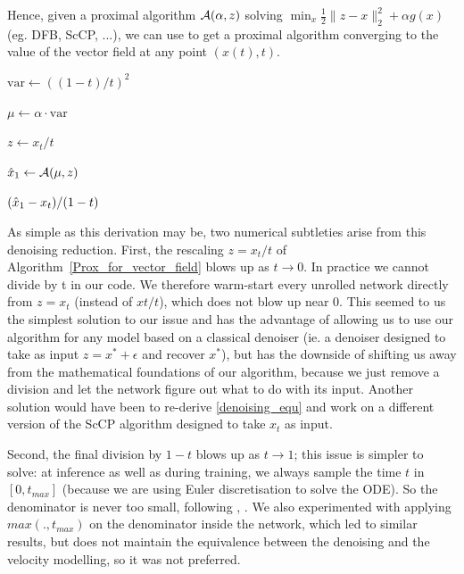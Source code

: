 \documentclass[a4paper,11pt]{article}
\theoremstyle{plain}{\theorembodyfont{\rmfamily}%
\newtheorem{proposition}[theorem]{Proposition}}
\theoremstyle{plain}{\theorembodyfont{\rmfamily}%
\newtheorem{notation}[theorem]{Notation}}
\theoremstyle{plain}{\theorembodyfont{\rmfamily}%
\newtheorem{assumption}[theorem]{Assumption}}
\theoremstyle{plain}{\theorembodyfont{\rmfamily}%
\newtheorem{problem}[theorem]{Problem}}
\theoremstyle{plain}{\theorembodyfont{\rmfamily}%
\newtheorem{example}[theorem]{Example}}
\theoremstyle{plain}{\theorembodyfont{\rmfamily}%
\newtheorem{remark}[theorem]{Remark}}
\theoremstyle{plain}{\theorembodyfont{\rmfamily}%
\newtheorem{definition}[theorem]{Definition}}
\theoremstyle{plain}{\theorembodyfont{\rmfamily}%
\newtheorem{question}[theorem]{Question}}
\numberwithin{equation}{section}
\begin{document}
Hence, given a proximal algorithm ${\mathcal{A}}(\alpha,z)$ solving $\min_{x} \frac{1}{2} \| z - x \|_2^2 + \alpha g(x)$ (eg. DFB, ScCP, ...), we can use  to get a proximal algorithm converging to the value of the vector field at any point $(x(t),t)$.

\begin{algorithm}
\caption{Prox\_for\_vector\_field($\Ac, x_t, t, \alpha$)}\label{Prox_for_vector_field}
\begin{algorithmic}[1]
\State $\mathrm{var} \gets ((1-t)/t)^2$ 

\State $\mu \gets \alpha \cdot \mathrm{var}$

\State $z \gets x_t/t$

\State $\Hat{x}_1 \gets {\ensuremath{\mathcal{A}}}(\mu,z)$

\Return $(\Hat{x}_1 - x_t)/(1-t)$

\end{algorithmic}
\end{algorithm}

As simple as this derivation may be, two numerical subtleties arise from this denoising reduction. First, the rescaling $z = x_t/t$ of Algorithm~\ref{Prox_for_vector_field} blows up as
$t \to 0$. In practice we cannot divide by t in our code. We therefore warm-start every unrolled network directly
from $z = x_t$ (instead of $xt/t$), which does not blow up near $0$. This seemed to us the simplest solution to our issue and has the advantage of allowing us to use our algorithm for any model based on a classical denoiser (ie. a denoiser designed to take as input $z = x^* + \epsilon$ and recover $x^*$), but has the downside of shifting us away from the mathematical foundations of our algorithm, because we just remove a division and let the network figure out what to do with its input. Another solution would have been to re-derive \ref{denoising_equ} and work on a different version of the ScCP algorithm designed to take $x_t$ as input.

Second, the final division by $1-t$ blows up as $t \to 1$; this issue is simpler to solve: at inference as well as during training, we always sample the time $t$ in $[0,t_{max}]$ (because we are using Euler discretisation to solve the ODE). So the denominator is never too small, following \cite[Section 3.3]{gagneux2025generation}, \cite{li2026back}. We also experimented with applying $max(.,t_{max})$ on the denominator inside the network, which led to similar results, but does not maintain the equivalence between the denoising and the velocity modelling, so it was not preferred.
\end{document}
